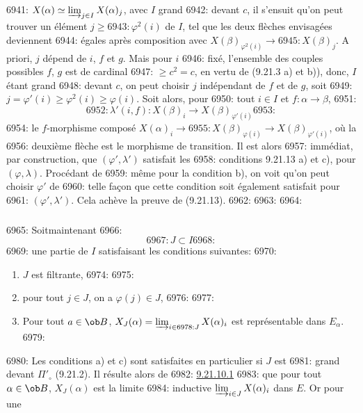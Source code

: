 6941: $X(\alpha)\simeq \varinjlim_{j\in I}X(\alpha)_j$, avec $I$ grand
6942: devant $c$, il s'ensuit qu'on peut trouver un élément $j\geq
6943: \varphi^2(i)$ de $I$, tel que les deux flèches envisagées deviennent
6944: égales après composition avec $X(\beta)_{\varphi^2(i)}\rightarrow
6945: X(\beta)_j$. A priori, $j$ dépend de $i$, $f$ et $g$. Mais pour $i$
6946: fixé, l'ensemble des couples possibles $f$, $g$ est de cardinal
6947: $\geq c^2=c$, en vertu de (9.21.3 a) et b)), donc, $I$ étant grand
6948: devant $c$, on peut choisir $j$ indépendant de $f$ et de $g$, soit
6949: $j=\varphi'(i)\geq \varphi^2(i)\geq \varphi(i)$. Soit alors, pour
6950: tout $i\in I$ et $f:\alpha\rightarrow \beta$,
6951: $$
6952: \lambda'(i,f):X(\beta)_i\longrightarrow X(\beta)_{\varphi'(i)}
6953: $$
6954: le $f$-morphisme composé $X(\alpha)_i\rightarrow
6955: X(\beta)_{\varphi(i)}\rightarrow X(\beta)_{\varphi'(i)}$, où la
6956: deuxième flèche est le morphisme de transition. Il est alors
6957: immédiat, par construction, que $(\varphi',\lambda')$ satisfait les
6958: conditions 9.21.13 a) et c), pour $(\varphi,\lambda)$. Procédant de
6959: même pour la condition b), on voit qu'on peut choisir $\varphi'$ de
6960: telle façon que cette condition soit également satisfait pour
6961: $(\varphi',\lambda')$. Cela achève la preuve de (9.21.13).
6962: 
6963: \setcounter{subsection}{21} \setcounter{subsubsection}{13}
6964: \subsubsection{}
6965: Soit\pageoriginale maintenant
6966: $$
6967: J\subset I
6968: $$
6969: une partie de $I$ satisfaisant les conditions suivantes:
6970: \begin{enumerate}
6971: \renewcommand{\theenumi}{\alph{enumi}}
6972: \renewcommand{\labelenumi}{\theenumi)}
6973: \item $J$ est filtrante,
6974: 
6975: \item pour tout $j\in J$, on a $\varphi(j)\in J$,
6976: 
6977: \item Pour tout $a\in \ob B$, $X_J(\alpha)=\varinjlim_{i\in
6978: J}X(\alpha)_i$ est représentable dans $E_{\alpha}$.
6979: \end{enumerate}
6980: Les conditions a) et c) sont satisfaites en particulier si $J$ est
6981: grand devant $\Pi'_\circ$ (9.21.2). Il résulte alors de
6982: \hyperref[I.cor9.21.10.1]{9.21.10.1}
6983: que pour tout $\alpha\in \ob B$, $X_J(\alpha)$ est la limite
6984: inductive $\varinjlim_{i\in J}X(\alpha)_i$ dans $E$. Or pour une
